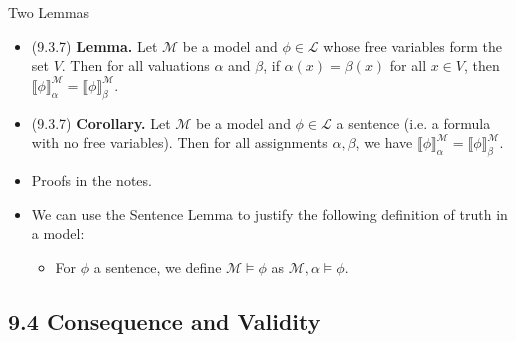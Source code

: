 \begin{frame}{Two Lemmas}

	\begin{itemize}

		\item (9.3.7) \textbf{Lemma.} Let $\mathcal{M}$ be a model and $\phi\in\mathcal{L}$ whose free variables form the set $V$. Then for all valuations $\alpha$ and $\beta$, if $\alpha(x)=\beta(x)$ for all $x\in V$, then $\llbracket\phi\rrbracket_\alpha^\mathcal{M}=\llbracket\phi\rrbracket_\beta^\mathcal{M}$.
		

\item (9.3.7) \textbf{Corollary.}	Let $\mathcal{M}$ be a model and $\phi\in\mathcal{L}$ a sentence (i.e. a formula with no free variables). Then for all assignments $\alpha,\beta$, we have $\llbracket\phi\rrbracket_\alpha^\mathcal{M}=\llbracket\phi\rrbracket_\beta^\mathcal{M}$.
		
		
		\item Proofs in the notes. 
		
		\item We can use the Sentence Lemma to justify the following definition of truth in a model:
		
		\begin{itemize}
		
			\item For $\phi$ a sentence, we define $\mathcal{M}\vDash\phi$ as $\mathcal{M},\alpha\vDash\phi$.
		
		\end{itemize}


\end{itemize}

\end{frame}

\subsection{9.4 Consequence and Validity}

